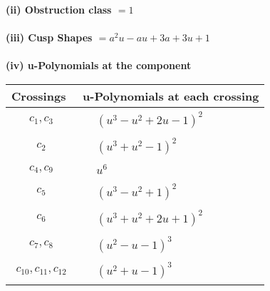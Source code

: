 \documentclass[1p]{elsarticle_modified}
\theoremstyle{definition}
\begin{document}
\flushleft \textbf{(ii) Obstruction class $= 1$}\\~\\
\flushleft \textbf{(iii) Cusp Shapes $= a^2 u- a u+3 a+3 u+1$}\\~\\
\newpage\renewcommand{\arraystretch}{1}
\flushleft \textbf{(iv) u-Polynomials at the component}\newline \\
\begin{tabular}{m{50pt}|m{274pt}}
Crossings & \hspace{64pt}u-Polynomials at each crossing \\
\hline $$\begin{aligned}c_{1},c_{3}\end{aligned}$$&$\begin{aligned}
&(u^3- u^2+2 u-1)^2
\end{aligned}$\\
\hline $$\begin{aligned}c_{2}\end{aligned}$$&$\begin{aligned}
&(u^3+u^2-1)^2
\end{aligned}$\\
\hline $$\begin{aligned}c_{4},c_{9}\end{aligned}$$&$\begin{aligned}
&u^6
\end{aligned}$\\
\hline $$\begin{aligned}c_{5}\end{aligned}$$&$\begin{aligned}
&(u^3- u^2+1)^2
\end{aligned}$\\
\hline $$\begin{aligned}c_{6}\end{aligned}$$&$\begin{aligned}
&(u^3+u^2+2 u+1)^2
\end{aligned}$\\
\hline $$\begin{aligned}c_{7},c_{8}\end{aligned}$$&$\begin{aligned}
&(u^2- u-1)^3
\end{aligned}$\\
\hline $$\begin{aligned}c_{10},c_{11},c_{12}\end{aligned}$$&$\begin{aligned}
&(u^2+u-1)^3
\end{aligned}$\\
\hline
\end{tabular}\\~\\
\end{document}
